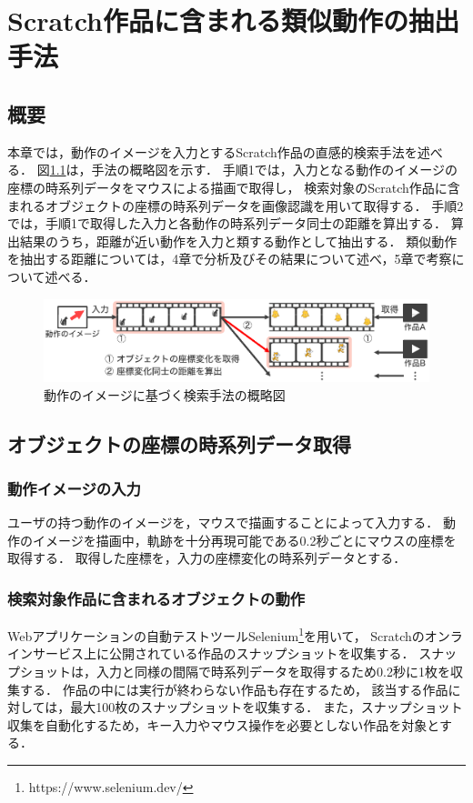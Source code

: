 \documentclass[11pt]{jreport}
\begin{document}
\chapter{Scratch作品に含まれる類似動作の抽出手法}

\section{概要}
本章では，動作のイメージを入力とするScratch作品の直感的検索手法を述べる．
図\ref{flow}は，手法の概略図を示す．
手順1では，入力となる動作のイメージの座標の時系列データをマウスによる描画で取得し，
検索対象のScratch作品に含まれるオブジェクトの座標の時系列データを画像認識を用いて取得する．
手順2では，手順1で取得した入力と各動作の時系列データ同士の距離を算出する．
算出結果のうち，距離が近い動作を入力と類する動作として抽出する．
類似動作を抽出する距離については，4章で分析及びその結果について述べ，5章で考察について述べる．

\begin{figure}[H]
    \centering
    \includegraphics[width=15cm]{flow.eps}
    \caption{動作のイメージに基づく検索手法の概略図}
    \label{flow}
\end{figure}

\section{オブジェクトの座標の時系列データ取得}

\subsection{動作イメージの入力}
ユーザの持つ動作のイメージを，マウスで描画することによって入力する．
動作のイメージを描画中，軌跡を十分再現可能である0.2秒ごとにマウスの座標を取得する．
取得した座標を，入力の座標変化の時系列データとする．

\subsection{検索対象作品に含まれるオブジェクトの動作}
Webアプリケーションの自動テストツールSelenium\footnote{https://www.selenium.dev/}を用いて，
Scratchのオンラインサービス上に公開されている作品のスナップショットを収集する．
スナップショットは，入力と同様の間隔で時系列データを取得するため0.2秒に1枚を収集する．
作品の中には実行が終わらない作品も存在するため，
該当する作品に対しては，最大100枚のスナップショットを収集する．
また，スナップショット収集を自動化するため，キー入力やマウス操作を必要としない作品を対象とする．
\end{document}
